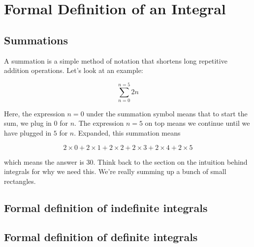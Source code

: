 \chapter{Formal Definition of an Integral}
\section{Summations}
A summation is a simple method of notation that shortens long repetitive addition operations. Let's look at an example:

\begin{equation}
\sum\limits_{n=0}^{n=5} 2n
\end{equation}

Here, the expression $n=0$ under the summation symbol means that to start the sum, we plug in $0$ for $n$. The expression $n=5$ on top means we continue until we have plugged in $5$ for $n$. Expanded, this summation means

\begin{equation}
2\times 0+2\times 1+2\times 2+2\times 3+2\times 4+2\times 5
\end{equation}

which means the answer is $30$. Think back to the section on the intuition behind integrals for why we need this. We're really summing up a bunch of small rectangles. 
\section{Formal definition of indefinite integrals}
\section{Formal definition of definite integrals}